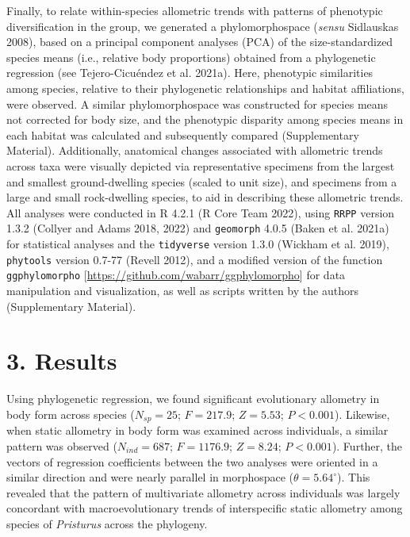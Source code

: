 \documentclass[
  11pt,
]{article}
\begin{document}
Finally, to relate within-species allometric trends with patterns of
phenotypic diversification in the group, we generated a phylomorphospace
(\emph{sensu} Sidlauskas 2008), based on a principal component analyses
(PCA) of the size-standardized species means (i.e., relative body
proportions) obtained from a phylogenetic regression (see
Tejero-Cicuéndez et al. 2021a). Here, phenotypic similarities among
species, relative to their phylogenetic relationships and habitat
affiliations, were observed. A similar phylomorphospace was constructed
for species means not corrected for body size, and the phenotypic
disparity among species means in each habitat was calculated and
subsequently compared (Supplementary Material). Additionally, anatomical
changes associated with allometric trends across taxa were visually
depicted via representative specimens from the largest and smallest
ground-dwelling species (scaled to unit size), and specimens from a
large and small rock-dwelling species, to aid in describing these
allometric trends. All analyses were conducted in R 4.2.1 (R Core Team
2022), using \texttt{RRPP} version 1.3.2 (Collyer and Adams 2018, 2022)
and \texttt{geomorph} 4.0.5 (Baken et al. 2021a) for statistical
analyses and the \texttt{tidyverse} version 1.3.0 (Wickham et al. 2019),
\texttt{phytools} version 0.7-77 (Revell 2012), and a modified version
of the function \texttt{ggphylomorpho}
{[}\url{https://github.com/wabarr/ggphylomorpho}{]} for data
manipulation and visualization, as well as scripts written by the
authors (Supplementary Material).

\hypertarget{results}{%
\section{3. Results}\label{results}}

Using phylogenetic regression, we found significant evolutionary
allometry in body form across species (\(N_{sp}=25\); \(F = 217.9\);
\(Z =5.53\); \(P < 0.001\)). Likewise, when static allometry in body
form was examined across individuals, a similar pattern was observed
(\(N_{ind}=687\); \(F = 1176.9\); \(Z =8.24\); \(P < 0.001\)). Further,
the vectors of regression coefficients between the two analyses were
oriented in a similar direction and were nearly parallel in morphospace
(\(\theta = 5.64^\circ\)). This revealed that the pattern of
multivariate allometry across individuals was largely concordant with
macroevolutionary trends of interspecific static allometry among species
of \emph{Pristurus} across the phylogeny. \hfill\break
\end{document}
